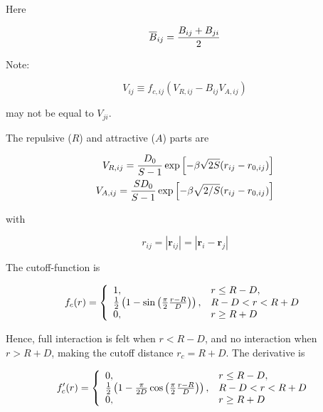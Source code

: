 \documentclass[a4paper,12pt,pdftex,onecolumn]{article}
\begin{document}
Here

\begin{equation}
\overline{B}_{ij} = {B_{ij} + B_{ji} \over 2}
\end{equation}

Note:

\begin{equation}
V_{ij} \equiv  f_{c,ij} \left( V_{R,ij} - B_{ij} V_{A,ij} \right)
\end{equation}

may not be equal to $V_{ji}$.

The repulsive ($R$) and attractive ($A$) parts are

\begin{eqnarray}
  V_{R,ij} = {D_0 \over S-1} \exp\left[ - \beta \sqrt{2S} (r_{ij} -r_{0,ij})
  \right] \\
  V_{A,ij} = {S D_0 \over S-1} \exp\left[ - \beta \sqrt{2/S} (r_{ij} -r_{0,ij})
  \right]
\end{eqnarray}

with

\begin{equation}
r_{ij} = |\mathbf{r}_{ij}| = | \mathbf{r}_i - \mathbf{r}_j |
\end{equation}

The cutoff-function is

\begin{equation}
f_c(r) =
\left\{
\begin{array}{ll}
1,                   & r \leq R - D, \\
{1 \over 2} \left( 1 - \sin \left( {\pi \over 2} {r - R \over D}
    \right) \right), & R-D < r < R + D \\
0,                   & r \geq R + D
\end{array}
\right.
\end{equation}

Hence, full interaction is felt when $r<R-D$, and no interaction when $r>R+D$,
making the cutoff distance $r_c = R+D$. The derivative is

\begin{equation}
f'_{c}(r) =
\left\{
\begin{array}{ll}
0,                   & r \leq R - D, \\
{1 \over 2} \left( 1 - {\pi \over 2D} \cos \left( {\pi \over 2} {r - R \over D}
    \right) \right), & R-D < r < R + D \\
0,                   & r \geq R + D
\end{array}
\right.
\end{equation}
\end{document}
